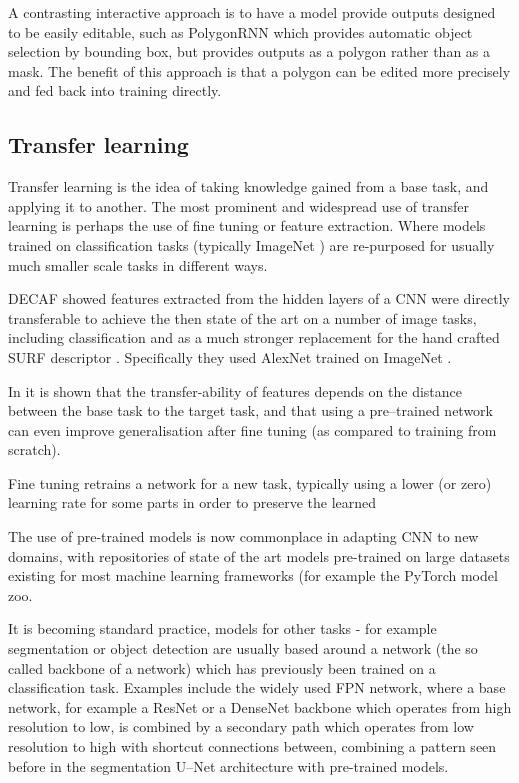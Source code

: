 A contrasting interactive approach is to have a model provide outputs designed to be easily editable, such as PolygonRNN \cite{Castrejon2017} which provides automatic object selection by bounding box, but provides outputs as a polygon rather than as a mask. The benefit of this approach is that a polygon can be edited more precisely and fed back into training directly.


\subsection {Transfer learning}

Transfer learning is the idea of taking knowledge gained from a base task, and applying it to another. The most prominent and widespread use of transfer learning is perhaps the use of fine tuning or feature extraction.  Where models trained on classification tasks (typically ImageNet \cite{JiaDeng2009}) are re-purposed for usually much smaller scale tasks in different ways. 

\gls{DECAF} \cite{Donahue2014} showed features extracted from the hidden layers of a \gls{CNN} were directly transferable to achieve the then state of the art on a number of image tasks, including classification and as a much stronger replacement for the hand crafted \gls{SURF} descriptor \cite{bay2006surf}.  Specifically they used AlexNet  \cite{Krizhevsky2012} trained on ImageNet \cite{JiaDeng2009}.

In \cite{Yosinski} it is shown that the transfer-ability of features depends on the distance between the base task to the target task, and that using a pre--trained network can even improve generalisation after fine tuning (as compared to training from scratch).

Fine tuning retrains a network for a new task, typically using a lower (or zero) learning rate for some parts in order to preserve the learned 

The use of pre-trained models is now commonplace in adapting \gls{CNN} to new domains, with repositories of state of the art models pre-trained on large datasets existing for most machine learning frameworks (for example the PyTorch \cite{Paszke2017} model zoo. 

It is becoming standard practice, models for other tasks - for example segmentation or object detection are usually based around a network (the so called backbone of a network) which has previously been trained on a classification task. Examples include the widely used \gls{FPN} network, \cite{Lin2017a} where a base network, for example a ResNet \cite{He} or a DenseNet \cite{Huang2016} backbone which operates from high resolution to low, is combined by a secondary path which operates from low resolution to high with shortcut connections between, combining a pattern seen before in the segmentation U--Net \cite{Ronneberger2015} architecture with pre-trained models.

